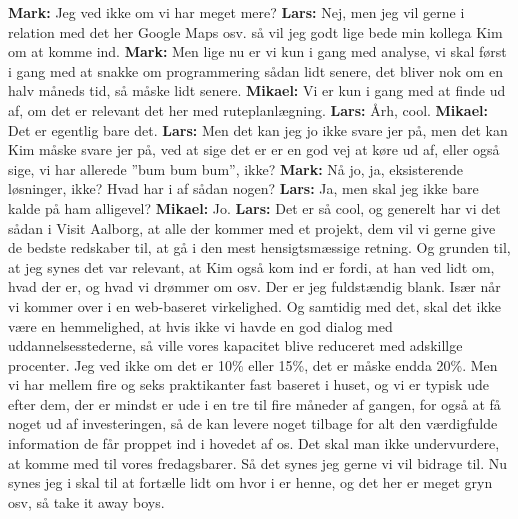 \textbf{Mark:} Jeg ved ikke om vi har meget mere? \newline	
\textbf{Lars:} Nej, men jeg vil gerne i relation med det her Google Maps osv. så vil jeg godt lige bede min kollega Kim om at komme ind. \newline
\textbf{Mark:} Men lige nu er vi kun i gang med analyse, vi skal først i gang med at snakke om programmering sådan lidt senere, det bliver nok om en halv måneds tid, så måske lidt senere. \newline
\textbf{Mikael:} Vi er kun i gang med at finde ud af, om det er relevant det her med ruteplanlægning. \newline
\textbf{Lars:} Årh, cool. \newline
\textbf{Mikael:} Det er egentlig bare det. \newline 
\textbf{Lars:} Men det kan jeg jo ikke svare jer på, men det kan Kim måske svare jer på, ved at sige det er er en god vej at køre ud af, eller også sige, vi har allerede ”bum bum bum”, ikke? \newline
\textbf{Mark:} Nå jo, ja, eksisterende løsninger, ikke? Hvad har i af sådan nogen? \newline
\textbf{Lars:} Ja, men skal jeg ikke bare kalde på ham alligevel? \newline
\textbf{Mikael:} Jo. \newline
\textbf{Lars:} Det er så cool, og generelt har vi det sådan i Visit Aalborg, at alle der kommer med et projekt, dem vil vi gerne give de bedste redskaber til, at gå i den mest hensigtsmæssige retning. Og grunden til, at jeg synes det var relevant, at Kim også kom ind er fordi, at han ved lidt om, hvad der er, og hvad vi drømmer om osv. Der er jeg fuldstændig blank. Især når vi kommer over i en web-baseret virkelighed. Og samtidig med det, skal det ikke være en hemmelighed, at hvis ikke vi havde en god dialog med uddannelsesstederne, så ville vores kapacitet blive reduceret med adskillge procenter. Jeg ved ikke om det er 10\% eller 15\%, det er måske endda 20\%. Men vi har mellem fire og seks praktikanter fast baseret i huset, og vi er typisk ude efter dem, der er mindst er ude i en tre til fire måneder af gangen, for også at få noget ud af investeringen, så de kan levere noget tilbage for alt den værdigfulde information de får proppet ind i hovedet af os. Det skal man ikke undervurdere, at komme med til vores fredagsbarer. Så det synes jeg gerne vi vil bidrage til. Nu synes jeg i skal til at fortælle lidt om hvor i er henne, og det her er meget gryn osv, så take it away boys. \newline
